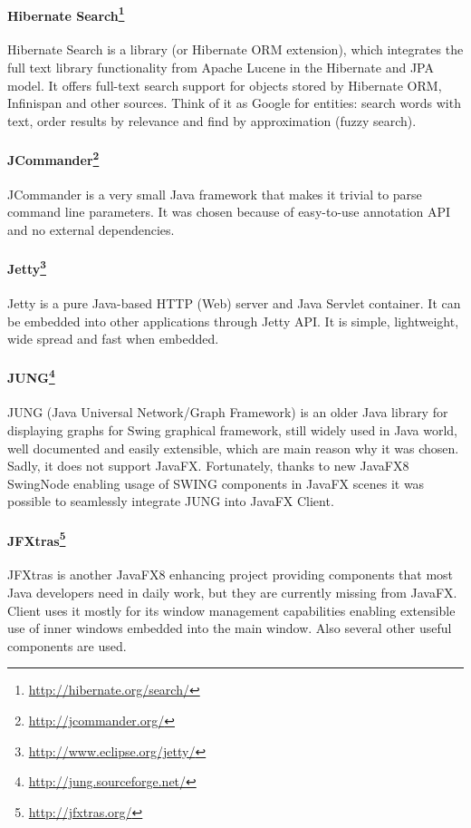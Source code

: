 \paragraph{Hibernate Search\footnote{\url{http://hibernate.org/search/}}}
Hibernate Search is a library (or Hibernate ORM extension), which integrates
the full text library functionality from Apache Lucene in the Hibernate and
JPA model. It offers full-text search support for objects stored by Hibernate
ORM, Infinispan and other sources. Think of it as Google\texttrademark{} for
entities: search words with text, order results by relevance and find by
approximation (fuzzy search).

\paragraph{JCommander\footnote{\url{http://jcommander.org/}}}
JCommander is a very small Java framework that makes it trivial to parse command
line parameters. It was chosen because of easy-to-use annotation API and no
external dependencies.

\paragraph{Jetty\footnote{\url{http://www.eclipse.org/jetty/}}}
Jetty is a pure Java-based HTTP (Web) server and Java Servlet container. It can
be embedded into other applications through Jetty API. It is simple,
lightweight, wide spread and fast when embedded.

\paragraph{JUNG\footnote{\url{http://jung.sourceforge.net/}}}
JUNG (Java Universal Network/Graph Framework) is an older Java library for
displaying graphs for Swing graphical framework, still widely used in Java
world, well documented and easily extensible, which are main reason why it was
chosen. Sadly, it does not support JavaFX. Fortunately, thanks to new JavaFX8
SwingNode enabling usage of SWING components in JavaFX scenes it was possible to
seamlessly integrate JUNG into JavaFX \textan{} Client.

\paragraph{JFXtras\footnote{\url{http://jfxtras.org/}}}
JFXtras is another JavaFX8 enhancing project providing components that
most Java developers need in daily work, but they are currently missing
from JavaFX. \textan{} Client uses it mostly for its window management
capabilities enabling extensible use of inner windows embedded into the main
window. Also several other useful components are used.

